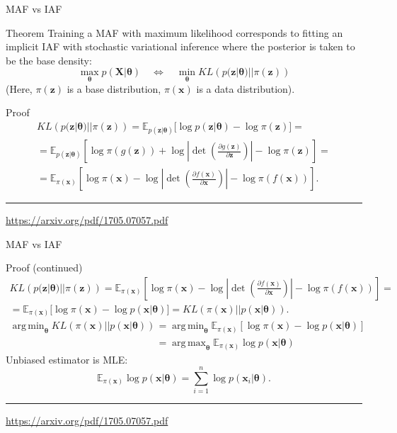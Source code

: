 \documentclass{beamer}
\newcommand{\bx}{\mathbf{x}}
\newcommand{\bz}{\mathbf{z}}
\newcommand{\bX}{\mathbf{X}}
\newcommand{\btheta}{\boldsymbol{\theta}}
\DeclareMathOperator*{\argmin}{arg\,min}
\DeclareMathOperator*{\argmax}{arg\,max}
\begin{document}
\begin{frame}{MAF vs IAF}
	\small{
		\begin{block}{Theorem}
			Training a MAF with maximum likelihood corresponds to fitting an implicit IAF  with stochastic variational inference where the posterior is taken to be the base density:
			\[  
			\max_{\btheta} p(\bX | \btheta) \quad \Leftrightarrow \quad \min_{\btheta} KL\left(p(\bz | \btheta) || \pi(\bz)\right)
			\]
			(Here, $\pi(\bz)$ is a base distribution, $\pi(\bx)$ is a data distribution).
		\end{block}
		\begin{block}{Proof}
			\vspace{-0.5cm}
			\begin{multline*}
				KL\left(p(\bz | \btheta) || \pi(\bz) \right) = \mathbb{E}_{p(\bz | \btheta)} \bigl[ \log p(\bz | \btheta) - \log \pi(\bz) \bigr] = \\ 
				= \mathbb{E}_{p(\bz | \btheta)} \left[ \log \pi(g(\bz)) + \log \left| \det \left( \frac{\partial g(\bz)}{\partial \bz}\right) \right| - \log \pi(\bz) \right] = \\
				= \mathbb{E}_{\pi(\bx)} \left[ \log \pi(\bx) - \log \left| \det \left( \frac{\partial f(\bx)}{\partial \bx}\right) \right| - \log \pi(f(\bx)) \right].
			\end{multline*}
		\end{block}
	}
	\vfill
	\hrule\medskip
	{\scriptsize \href{https://arxiv.org/pdf/1705.07057.pdf}{https://arxiv.org/pdf/1705.07057.pdf}} 
\end{frame}
\begin{frame}{MAF vs IAF}
	\begin{block}{Proof (continued)}
		{\small
			\begin{multline*}
				KL\left(p(\bz | \btheta) || \pi(\bz) \right) = \mathbb{E}_{\pi(\bx)} \left[ \log \pi(\bx) - \log \left| \det \left( \frac{\partial f(\bx)}{\partial \bx}\right) \right| - \log \pi(f(\bx)) \right] = \\
				= \mathbb{E}_{\pi(\bx)} \bigl[ \log \pi(\bx) - \log p(\bx | \btheta) \bigr] = KL (\pi(\bx) || p(\bx | \btheta)).
			\end{multline*}
			\begin{align*}
				\argmin_{\btheta}  KL (\pi(\bx) || p(\bx | \btheta)) &= \argmin_{\btheta} \mathbb{E}_{\pi(\bx)} \left[ \log \pi(\bx) - \log p(\bx | \btheta) \right] \\
				&= \argmax_{\btheta} \mathbb{E}_{\pi(\bx)} \log p(\bx | \btheta)
			\end{align*}
			Unbiased estimator is MLE:
			\[
			\mathbb{E}_{\pi(\bx)} \log p(\bx | \btheta) = \sum_{i=1}^n \log p(\bx_i | \btheta).
			\]
		}
	\end{block}
	\vfill
	\hrule\medskip
	{\scriptsize \href{https://arxiv.org/pdf/1705.07057.pdf}{https://arxiv.org/pdf/1705.07057.pdf}} 
\end{frame}
\end{document}
